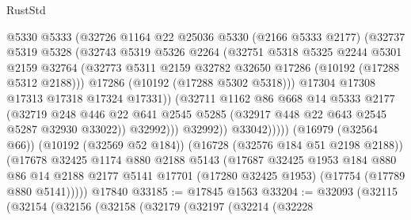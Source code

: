 \begin{lexlean}{RustStd}
\begin{coremodule}
                      @5330
                      @5333
                      (@32726
                        @1164
                        @22
                        @25036
                        @5330
                        (@2166 @5333 @2177)
                        (@32737
                          @5319
                          @5328
                          (@32743
                            @5319
                            @5326
                            @2264
                            (@32751
                              @5318
                              @5325
                              @2244
                              @5301
                              @2159
                              @32764
                              (@32773
                                @5311
                                @2159
                                @32782
                                @32650
                                @17286
                                (@10192 (@17288 @5312 @2188)))
                              @17286
                              (@10192 (@17288 @5302 @5318)))
                            @17304
                            @17308
                            @17313
                            @17318
                            @17324
                            @17331))
                        (@32711
                          @1162
                          @86
                          @668
                          @14
                          @5333
                          @2177
                          (@32719
                            @248
                            @446
                            @22
                            @641
                            @2545
                            @5285
                            (@32917 @448 @22 @643 @2545 @5287 @32930 @33022))
                          @32992)))
                    @32992))
                @33042)))))
      (@16979 (@32564 @66))
      (@10192 (@32569 @52 @184))
      (@16728 (@32576 @184 @51 @2198 @2188))
      (@17678
        @32425
        @1174
        @880
        @2188
        @5143
        (@17687
          @32425
          @1953
          @184
          @880
          @86
          @14
          @2188
          @2177
          @5141
          @17701
          (@17280 @32425 @1953)
          (@17754 (@17789 @880 @5141)))))
    @17840
@33185 := @17845 @1563
@33204 := @32093
    (@32115
      (@32154
        (@32156
          (@32158
            (@32179
              (@32197
                (@32214
                  (@32228

\end{coremodule}
\end{lexlean}
